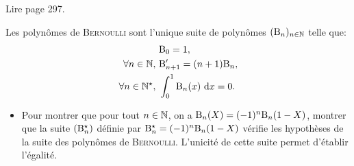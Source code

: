 Lire \cite{calcul_infinitesimal} page 297.
\begin{tcolorbox}
    Les polynômes de \textsc{Bernoulli} sont l'unique suite de polynômes $(\mathrm{B}_n)_{n \in \mathbb{N}}$ telle que:
    \begin{align*}
        &\mathrm{B}_0 = 1, \\
        \forall n \in \mathbb{N},\ &\mathrm{B}'_{n+1} = (n+1)\mathrm{B}_n, \\
        \forall n \in \mathbb{N}^\star,\ &\int_{0}^{1} \mathrm{B}_n(x)\ \mathrm{d} x = 0.
    \end{align*}
\end{tcolorbox}

\begin{itemize}
    \item Pour montrer que pour tout $n \in \mathbb{N}$, on a $\mathrm{B}_n(X)=(-1)^n \mathrm{B}_n(1-X)$, montrer que la suite $(\mathrm{B}_n^{\star})$ définie par $\mathrm{B}_n^{\star} = (-1)^n \mathrm{B}_n(1-X)$ vérifie les hypothèses de la suite des polynômes de \textsc{Bernoulli}. L'unicité de cette suite permet d'établir l'égalité. 
\end{itemize}